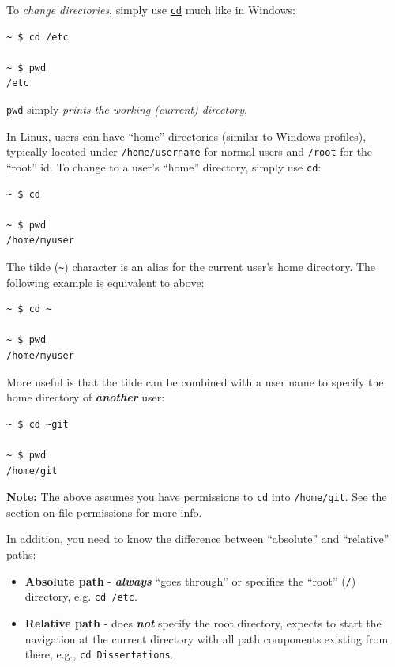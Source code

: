 \documentclass[10pt,]{book}
\numberwithin{figure}{chapter}
\begin{document}
To \emph{change directories}, simply use
\href{http://linux.die.net/man/1/cd}{\texttt{cd}} much like in Windows:

\begin{verbatim}
~ $ cd /etc

~ $ pwd
/etc
\end{verbatim}

\href{http://linux.die.net/man/1/pwd}{\texttt{pwd}} simply \emph{prints
the working (current) directory}.

In Linux, users can have ``home'' directories (similar to Windows
profiles), typically located under \texttt{/home/username} for normal
users and \texttt{/root} for the ``root'' id. To change to a user's
``home'' directory, simply use \texttt{cd}:

\begin{verbatim}
~ $ cd

~ $ pwd
/home/myuser
\end{verbatim}

The tilde (\texttt{\textasciitilde{}}) character is an alias for the
current user's home directory. The following example is equivalent to
above:

\begin{verbatim}
~ $ cd ~

~ $ pwd
/home/myuser
\end{verbatim}

More useful is that the tilde can be combined with a user name to
specify the home directory of \textbf{\emph{another}} user:

\begin{verbatim}
~ $ cd ~git

~ $ pwd
/home/git
\end{verbatim}

\textbf{Note:} The above assumes you have permissions to \texttt{cd}
into \texttt{/home/git}. See the section on file permissions for more
info.

In addition, you need to know the difference between ``absolute'' and
``relative'' paths:

\begin{itemize}
\item
  \textbf{Absolute path} - \textbf{\emph{always}} ``goes through'' or
  specifies the ``root'' (\texttt{/}) directory, e.g. \texttt{cd /etc}.
\item
  \textbf{Relative path} - does \textbf{\emph{not}} specify the root
  directory, expects to start the navigation at the current directory
  with all path components existing from there, e.g.,
  \texttt{cd Dissertations}.
\end{itemize}
\end{document}
